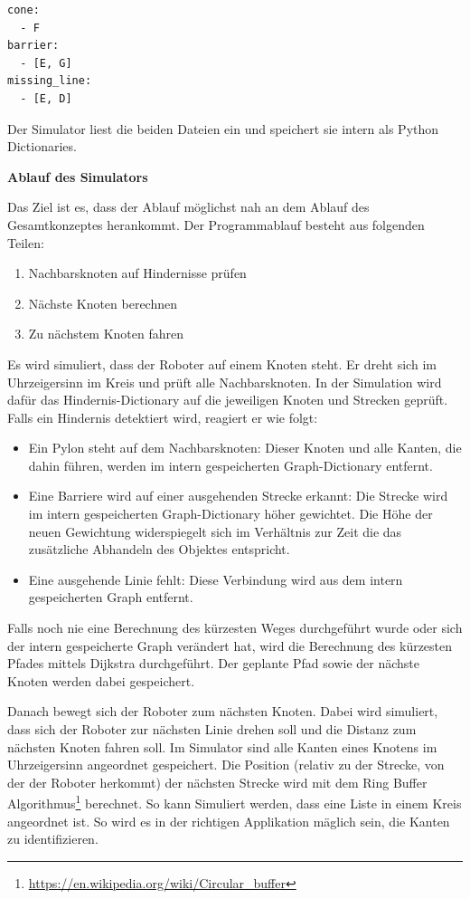 \begin{verbatim}
cone:
  - F
barrier:
  - [E, G]
missing_line:
  - [E, D]
\end{verbatim}

Der Simulator liest die beiden Dateien ein und speichert sie intern als Python Dictionaries.

\textbf{Ablauf des Simulators}

Das Ziel ist es, dass der Ablauf möglichst nah an dem Ablauf des Gesamtkonzeptes herankommt.
Der Programmablauf besteht aus folgenden Teilen:
\begin{enumerate}
    \item Nachbarsknoten auf Hindernisse prüfen
    \item Nächste Knoten berechnen
    \item Zu nächstem Knoten fahren
\end{enumerate}

Es wird simuliert, dass der Roboter auf einem Knoten steht. Er dreht sich im Uhrzeigersinn im Kreis und prüft alle Nachbarsknoten. In der Simulation wird dafür das Hindernis-Dictionary auf die jeweiligen Knoten und Strecken geprüft. Falls ein Hindernis detektiert wird, reagiert er wie folgt:

\begin{itemize}
    \item Ein Pylon steht auf dem Nachbarsknoten: Dieser Knoten und alle Kanten, die dahin führen, werden im intern gespeicherten Graph-Dictionary entfernt.
    \item Eine Barriere wird auf einer ausgehenden Strecke erkannt: Die Strecke wird im intern gespeicherten Graph-Dictionary höher gewichtet. Die Höhe der neuen Gewichtung widerspiegelt sich im Verhältnis zur Zeit die das zusätzliche Abhandeln des Objektes entspricht.
    \item Eine ausgehende Linie fehlt: Diese Verbindung wird aus dem intern gespeicherten Graph entfernt.
\end{itemize}

Falls noch nie eine Berechnung des kürzesten Weges durchgeführt wurde oder sich der intern gespeicherte Graph verändert hat, wird die Berechnung des kürzesten Pfades mittels Dijkstra durchgeführt. Der geplante Pfad sowie der nächste Knoten werden dabei gespeichert.

Danach bewegt sich der Roboter zum nächsten Knoten. Dabei wird simuliert, dass sich der Roboter zur nächsten Linie drehen soll und die Distanz zum nächsten Knoten fahren soll. Im Simulator sind alle Kanten eines Knotens im Uhrzeigersinn angeordnet gespeichert. Die Position (relativ zu der Strecke, von der der Roboter herkommt) der nächsten Strecke wird mit dem Ring Buffer Algorithmus\footnote{\url{https://en.wikipedia.org/wiki/Circular\_buffer}} berechnet. So kann Simuliert werden, dass eine Liste in einem Kreis angeordnet ist. So wird es in der richtigen Applikation mäglich sein, die Kanten zu identifizieren. 

